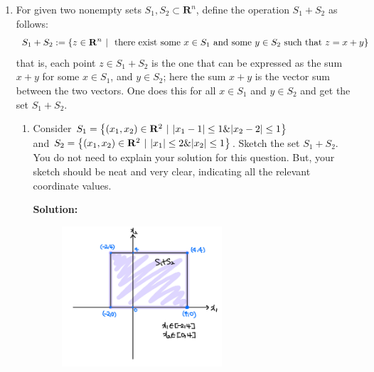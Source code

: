 \documentclass[11pt]{article}
\newenvironment{solution}
  {\par\noindent\textbf{Solution:}\par}
  {\par}
\begin{document}
\begin{enumerate}
\begin{solution}
      Therefore, $rS$ is also a convex set.
    \end{solution}

  \item For given two nonempty sets $S_1,S_2 \subset \mathbf{R}^n$, define the operation $S_1+S_2$ as follows:
    $$S_1+S_2 := \left\{ z \in \mathbf{R}^n \hspace{.05in} \vert \hspace{.05in} \text{ there exist some } x \in S_1 \text{ and some } y \in S_2 \text{ such that } z =x+y \right\}$$
    that is, each point $z \in S_1 + S_2$ is the one that can be expressed as the sum $x+y$ for some $x \in S_1$,
    and $y \in S_2$; here the sum $x+y$ is the vector sum between the two vectors. One does this for 
    all $x \in S_1$ and $y \in S_2$ and get the set $S_1 + S_2$.

    \begin{enumerate}[label=(\alph*)]
      \item Consider $S_1 = \left\{ (x_1,x_2) \in \mathbf{R}^2 \hspace{.05in} \vert \hspace{.05in}
        \vert x_1 - 1\vert \le 1 \& \vert x_2 -2 \vert \le 1\right\}$ \\  
        and $ S_2 = \left\{ (x_1,x_2) \in \mathbf{R}^2 \hspace{.05in} \vert \hspace{.05in}
        \vert x_1\vert \le 2 \& \vert x_2 \vert \le 1\right\}$. Sketch the set $S_1 + S_2$. You do not need to explain 
        your solution for this question. But, your sketch should be neat and very clear, indicating all the 
        relevant coordinate values.
        \begin{solution}
        

\begin{figure}[H]
\centering
\includegraphics[width=0.6\textwidth]{figure1.png} 


\end{figure}
\end{solution}
\end{enumerate}
\end{enumerate}
\end{document}
